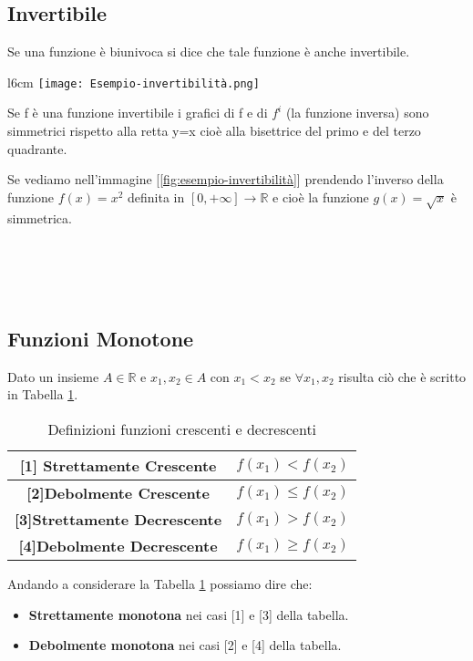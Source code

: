 \subsection{Invertibile}
\begin{definition}[Invertibile]
Se una funzione è biunivoca si dice che tale funzione è anche invertibile.
\end{definition}
\begin{wrapfigure}{l}{6cm}
    \centering
    \texttt{[image: Esempio-invertibilità.png]}
    \caption{$f(x) = x^2$ e $g(x) = \sqrt{x}$}
    \label{fig:esempio-invertibilità}
\end{wrapfigure}
Se f è una funzione invertibile i grafici di f e di $f^i$ (la funzione inversa) sono simmetrici rispetto alla retta y=x cioè alla bisettrice del primo e del terzo quadrante. \\
\begin{example}
Se vediamo nell'immagine [\ref{fig:esempio-invertibilità}] prendendo l'inverso della funzione $f(x) = x^2$ definita in $[0, +\infty] \longrightarrow \mathbb{R}$ e cioè la funzione $g(x) = \sqrt{x}$ è simmetrica.
\\ \\ \\ \\ \\
\end{example}

\subsection{Funzioni Monotone}
\begin{definition}[Monotone]
Dato un insieme $A \in \mathbb{R}$ e $x_1, x_2 \in A$ con $x_1 < x_2$ se $\forall x_1, x_2$ risulta ciò che è scritto in Tabella \ref{tab:monotone}.
\end{definition}
\begin{table}[h!]
    \centering
    \setlength{\tabcolsep}{6pt}
    \renewcommand{\arraystretch}{1.7}
    \begin{tabular}{|c|c|}
        \hline
        \textbf{[1] Strettamente Crescente} & $f(x_1) < f(x_2) $ \\ \hline
        \textbf{[2]Debolmente Crescente} & $f(x_1) \leq f(x_2) $ \\ \hline
        \textbf{[3]Strettamente Decrescente} & $f(x_1) > f(x_2) $ \\ \hline
        \textbf{[4]Debolmente Decrescente} & $f(x_1) \geq f(x_2) $ \\ \hline
    \end{tabular}
    \caption{Definizioni funzioni crescenti e decrescenti}
    \label{tab:monotone}
\end{table}
Andando a considerare la Tabella \ref{tab:monotone} possiamo dire che:
\begin{itemize}
    \item \textbf{Strettamente monotona} nei casi [1] e [3] della tabella.
    \item \textbf{Debolmente monotona} nei casi [2] e [4] della tabella.
\end{itemize}

